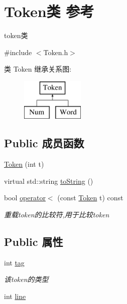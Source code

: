 \hypertarget{class_token}{}\section{Token类 参考}
\label{class_token}


token类  




{\ttfamily \#include $<$Token.\+h$>$}

类 Token 继承关系图\+:\begin{figure}[H]
\begin{center}
\leavevmode
\includegraphics[height=2.000000cm]{class_token}
\end{center}
\end{figure}
\subsection*{Public 成员函数}
\begin{DoxyCompactItemize}
\item 
\hyperlink{class_token_a29580f176bfba9981aeec62946114675}{Token} (int t)
\item 
virtual std\+::string \hyperlink{class_token_a8863381edabce7bc1e92473b445ba81f}{to\+String} ()
\item 
\mbox{\label{class_token_a745ea87ba20ab7e4d3f9061c62c179ca}} 
bool \hyperlink{class_token_a745ea87ba20ab7e4d3f9061c62c179ca}{operator$<$} (const \hyperlink{class_token}{Token} t) const
\begin{DoxyCompactList}\small\item\em 重载token的比较符,用于比较token \end{DoxyCompactList}\end{DoxyCompactItemize}
\subsection*{Public 属性}
\begin{DoxyCompactItemize}
\item 
\mbox{\label{class_token_a2a4b0e1b648c2a9be1976004eb3c4ff0}} 
int \hyperlink{class_token_a2a4b0e1b648c2a9be1976004eb3c4ff0}{tag}
\begin{DoxyCompactList}\small\item\em 该token的类型 \end{DoxyCompactList}\item 
int \hyperlink{class_token_a4b96c2a31d7c374fd2bd1986794f80dd}{line}
\end{DoxyCompactItemize}


